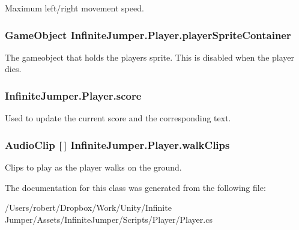Maximum left/right movement speed. 

\hypertarget{class_infinite_jumper_1_1_player_a252f068cd18db2fc2872aecd78cea356}{}
\subsubsection[{player\+Sprite\+Container}]{\setlength{\rightskip}{0pt plus 5cm}Game\+Object Infinite\+Jumper.\+Player.\+player\+Sprite\+Container}\label{class_infinite_jumper_1_1_player_a252f068cd18db2fc2872aecd78cea356}


The gameobject that holds the players sprite. This is disabled when the player dies. 

\hypertarget{class_infinite_jumper_1_1_player_a908c55d32a3176d7d2a9ebd85212dc83}{}
\subsubsection[{score}]{ Infinite\+Jumper.\+Player.\+score}\label{class_infinite_jumper_1_1_player_a908c55d32a3176d7d2a9ebd85212dc83}


Used to update the current score and the corresponding text. 

\hypertarget{class_infinite_jumper_1_1_player_ae09844508009d9007bc7c72572ba99a9}{}
\subsubsection[{walk\+Clips}]{\setlength{\rightskip}{0pt plus 5cm}Audio\+Clip \mbox{[}$\,$\mbox{]} Infinite\+Jumper.\+Player.\+walk\+Clips}\label{class_infinite_jumper_1_1_player_ae09844508009d9007bc7c72572ba99a9}


Clips to play as the player walks on the ground. 



The documentation for this class was generated from the following file\+:\begin{DoxyCompactItemize}
\item 
/\+Users/robert/\+Dropbox/\+Work/\+Unity/\+Infinite Jumper/\+Assets/\+Infinite\+Jumper/\+Scripts/\+Player/Player.\+cs\end{DoxyCompactItemize}
